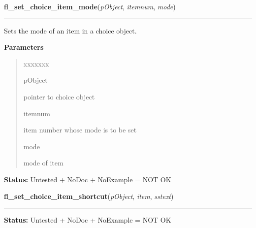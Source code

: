     \label{xformslib:library:fl_set_choice_item_mode}

    \vspace{0.5ex}

\hspace{.8\funcindent}\begin{boxedminipage}{\funcwidth}

    \raggedright \textbf{fl\_set\_choice\_item\_mode}(\textit{pObject}, \textit{itemnum}, \textit{mode})

    \vspace{-1.5ex}

    \rule{\textwidth}{0.5\fboxrule}
\setlength{\parskip}{2ex}
    Sets the mode of an item in a choice object.

\setlength{\parskip}{1ex}
      \textbf{Parameters}
      \vspace{-1ex}

      \begin{quote}
        \begin{Ventry}{xxxxxxx}

          \item[pObject]

          pointer to choice object

          \item[itemnum]

          item number whose mode is to be set

          \item[mode]

          mode of item

        \end{Ventry}

      \end{quote}

\textbf{Status:} Untested + NoDoc + NoExample = NOT OK



    \end{boxedminipage}

    \label{xformslib:library:fl_set_choice_item_shortcut}

    \vspace{0.5ex}

\hspace{.8\funcindent}\begin{boxedminipage}{\funcwidth}

    \raggedright \textbf{fl\_set\_choice\_item\_shortcut}(\textit{pObject}, \textit{item}, \textit{sstext})

    \vspace{-1.5ex}

    \rule{\textwidth}{0.5\fboxrule}
\setlength{\parskip}{2ex}
\setlength{\parskip}{1ex}
\textbf{Status:} Untested + NoDoc + NoExample = NOT OK



    \end{boxedminipage}

